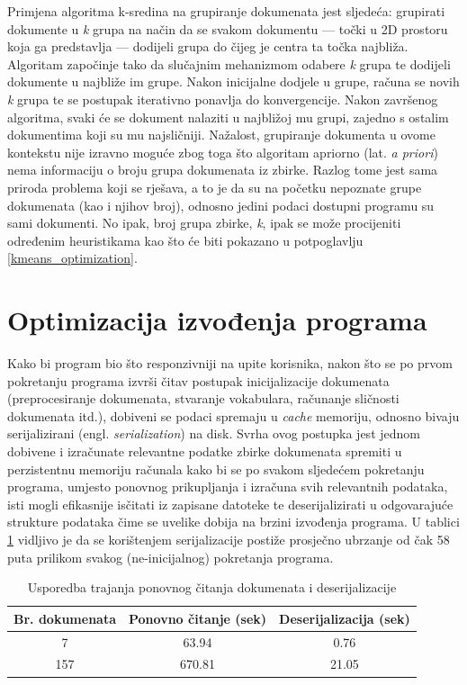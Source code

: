 \documentclass[times, utf8, zavrsni]{fer}
\begin{document}
Primjena algoritma k-sredina na grupiranje dokumenata jest sljedeća: grupirati dokumente u \textit{k} grupa na način da se svakom dokumentu — točki u 2D prostoru koja ga predstavlja — dodijeli grupa do čijeg je centra ta točka najbliža. Algoritam započinje tako da slučajnim mehanizmom odabere \textit{k} grupa te dodijeli dokumente u najbliže im grupe. Nakon inicijalne dodjele u grupe, računa se novih \textit{k} grupa te se postupak iterativno ponavlja do konvergencije. Nakon završenog algoritma, svaki će se dokument nalaziti u najbližoj mu grupi, zajedno s ostalim dokumentima koji su mu najsličniji.
Nažalost, grupiranje dokumenta u ovome kontekstu nije izravno moguće zbog toga što algoritam apriorno (lat. \textit{a priori}) nema informaciju o broju grupa dokumenata iz zbirke. Razlog tome jest sama priroda problema koji se rješava, a to je da su na početku nepoznate grupe dokumenata (kao i njihov broj), odnosno jedini podaci dostupni programu su sami dokumenti. No ipak, broj grupa zbirke, \textit{k}, ipak se može procijeniti određenim heuristikama kao što će biti pokazano u potpoglavlju \ref{kmeans_optimization}.

\section{Optimizacija izvođenja programa}
Kako bi program bio što responzivniji na upite korisnika, nakon što se po prvom pokretanju programa izvrši čitav postupak inicijalizacije dokumenata (preprocesiranje dokumenata, stvaranje vokabulara, računanje sličnosti dokumenata itd.), dobiveni se podaci spremaju u \textit{cache} memoriju, odnosno bivaju serijalizirani (engl. \textit{serialization}) na disk. Svrha ovog postupka jest jednom dobivene i izračunate relevantne podatke zbirke dokumenata spremiti u perzistentnu memoriju računala kako bi se po svakom sljedećem pokretanju programa, umjesto ponovnog prikupljanja i izračuna svih relevantnih podataka, isti mogli efikasnije isčitati iz zapisane datoteke te deserijalizirati u odgovarajuće strukture podataka čime se uvelike dobija na brzini izvođenja programa. U tablici
\ref{table:serialization} vidljivo je da se korištenjem serijalizacije postiže prosječno ubrzanje od čak 58 puta prilikom svakog (ne-inicijalnog) pokretanja programa.

\begin{table}
\begin{center}
\begin{tabular}{|c|c|c|}
\hline
Br. dokumenata & Ponovno čitanje (sek) & Deserijalizacija (sek) \\
\hline
7 & 63.94 & 0.76 \\
157 & 670.81 & 21.05 \\
\hline
\end{tabular}
\end{center}
\caption{Usporedba trajanja ponovnog čitanja dokumenata i deserijalizacije}
\label{table:serialization}
\end{table}
\end{document}
